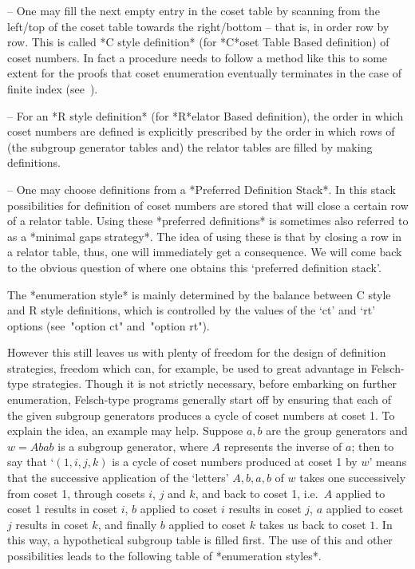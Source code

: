 \beginlist

\item{--} One may fill the next empty entry  in  the  coset  table  by
scanning from the left/top of the coset table towards the right/bottom
--  that  is,  in  order  row  by  row.  This   is   called   *C style
definition*  (for
*C*oset Table Based definition) of coset numbers. In fact a  procedure
needs to follow a method like this to some extent for the proofs  that
coset enumeration eventually terminates in the case  of  finite  index
(see~\cite{Neu82}).

\item{--} For an *R style definition* (for *R*elator Based definition), the order in which
coset numbers are defined is explicitly prescribed  by  the  order  in
which rows of (the subgroup generator tables and) the  relator  tables
are filled by making definitions.

\item{--} One may choose  definitions  from  a  *Preferred  Definition
Stack*. In this stack  possibilities
for definition of coset numbers are stored that will close  a  certain
row    of    a    relator    table.     Using     these     *preferred
definitions* is sometimes  also  referred
to as a *minimal gaps  strategy*.  The
idea of using these is that by closing a row in a relator table, thus,
one will immediately get a consequence.  We  will  come  back  to  the
obvious question of where one obtains this  \lq{}preferred  definition
stack'.

\endlist

The *enumeration style* is mainly determined by  the  balance  between
C style and R style definitions, which is controlled by the values  of
the `ct' and `rt' options (see~"option ct" and~"option rt").

However this still leaves us with plenty of freedom for the design  of
definition strategies, freedom which can,  for  example,  be  used  to
great advantage in Felsch-type strategies. Though it is  not  strictly
necessary,  before  embarking  on  further  enumeration,   Felsch-type
programs generally start off  by  ensuring  that  each  of  the  given
subgroup generators produces a cycle of coset numbers at coset  1.  To
explain the idea, an example may help. Suppose  $a,b$  are  the  group
generators and $w=Abab$ is a subgroup generator, where $A$  represents
the inverse of $a$; then to say that \lq{}$(1,i,j,k)$ is  a  cycle  of
coset numbers produced at coset 1 by $w$' means  that  the  successive
application  of  the  \lq{}letters'  $A,b,a,b$  of   $w$   takes   one
successively from coset 1, through cosets $i$, $j$ and $k$,  and  back
to coset 1, i.e.~$A$ applied to coset 1  results  in  coset  $i$,  $b$
applied to coset $i$ results in coset $j$, $a$ applied  to  coset  $j$
results in coset $k$, and finally $b$ applied to coset  $k$  takes  us
back to coset $1$. In this  way,  a  hypothetical  subgroup  table  is
filled first. The use of this and other  possibilities  leads  to  the
following table of *enumeration styles*.

